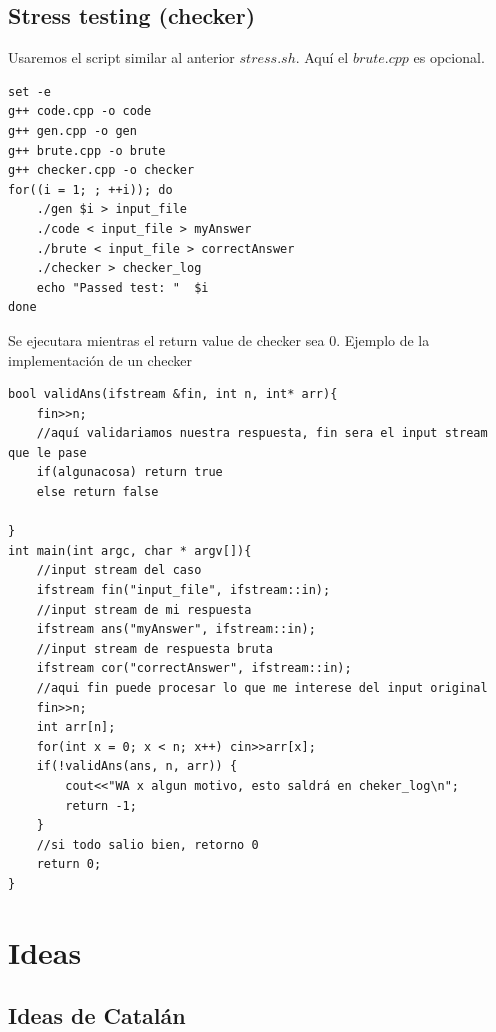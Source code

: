 \documentclass[10pt,spanish,mexico]{article}
\numberwithin{equation}{section}
\begin{document}
\begin{multicols}{2}
\vspace{-1.2\baselineskip}
\hrulefill
\subsection{Stress testing (checker)}
Usaremos el script similar al anterior $stress.sh$. Aquí el $brute.cpp$ es opcional.

\begin{verbatim}
set -e
g++ code.cpp -o code
g++ gen.cpp -o gen
g++ brute.cpp -o brute
g++ checker.cpp -o checker
for((i = 1; ; ++i)); do
    ./gen $i > input_file
    ./code < input_file > myAnswer
    ./brute < input_file > correctAnswer
    ./checker > checker_log
    echo "Passed test: "  $i
done
\end{verbatim}

Se ejecutara mientras el return value de checker sea $0$. Ejemplo de la implementación de un checker

\begin{verbatim}
bool validAns(ifstream &fin, int n, int* arr){
    fin>>n;
    //aquí validariamos nuestra respuesta, fin sera el input stream que le pase
    if(algunacosa) return true
    else return false

}
int main(int argc, char * argv[]){
    //input stream del caso
    ifstream fin("input_file", ifstream::in);
    //input stream de mi respuesta
    ifstream ans("myAnswer", ifstream::in);
    //input stream de respuesta bruta
    ifstream cor("correctAnswer", ifstream::in);
    //aqui fin puede procesar lo que me interese del input original
    fin>>n;
    int arr[n];
    for(int x = 0; x < n; x++) cin>>arr[x];
    if(!validAns(ans, n, arr)) {
        cout<<"WA x algun motivo, esto saldrá en cheker_log\n";
        return -1;
    }
    //si todo salio bien, retorno 0
    return 0;
}
\end{verbatim}

\vspace{-1.2\baselineskip}
\hrulefill
\section{Ideas}
\subsection{Ideas de Catalán}


\end{multicols}
\end{document}
